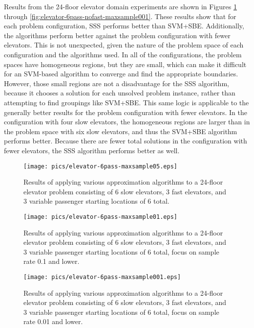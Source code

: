 Results from the 24-floor elevator domain experiments are shown in Figures \ref{fig:elevator-6pass-maxsample05} through \ref{fig:elevator-6pass-nofast-maxsample001}.  These results show that for each problem configuration, SSS performs better than SVM+SBE.  Additionally, the algorithms perform better against the problem configuration with fewer elevators.  This is not unexpected,  given the nature of the problem space of each configuration and the algorithms used.  In all of the configurations, the problem spaces have homogeneous regions, but they are small, which can make it difficult for an SVM-based algorithm to converge and find the appropriate boundaries.  However, those small regions are not a disadvantage for the SSS algorithm, because it chooses a solution for each unsolved problem instance, rather than attempting to find groupings like SVM+SBE.  This same logic is applicable to the generally better results for the problem configuration with fewer elevators.  In the  configuration with four slow elevators, the homogeneous regions are larger than in the  problem space with six slow elevators, and thus the SVM+SBE algorithm performs better.  Because there are fewer total solutions in the configuration with fewer elevators, the SSS algorithm performs better as well.





\begin{figure}
\begin{center}
\texttt{[image: pics/elevator-6pass-maxsample05.eps]}
\caption{Results of applying various approximation algorithms to a 24-floor elevator problem consisting of 6 slow elevators, 3 fast elevators, and 3 variable passenger starting locations of 6 total.}
\label{fig:elevator-6pass-maxsample05}
\end{center}
\end{figure}

\begin{figure}
\begin{center}
\texttt{[image: pics/elevator-6pass-maxsample01.eps]}
\caption{Results of applying various approximation algorithms to a 24-floor elevator problem consisting of 6 slow elevators, 3 fast elevators, and 3 variable passenger starting locations of 6 total, focus on sample rate 0.1 and lower.}
\label{fig:elevator-6pass-maxsample01}
\end{center}
\end{figure}

\begin{figure}
\begin{center}
\texttt{[image: pics/elevator-6pass-maxsample001.eps]}
\caption{Results of applying various approximation algorithms to a 24-floor elevator problem consisting of 6 slow elevators, 3 fast elevators, and 3 variable passenger starting locations of 6 total, focus on sample rate 0.01 and lower.}
\label{fig:elevator-6pass-maxsample001}
\end{center}
\end{figure}







